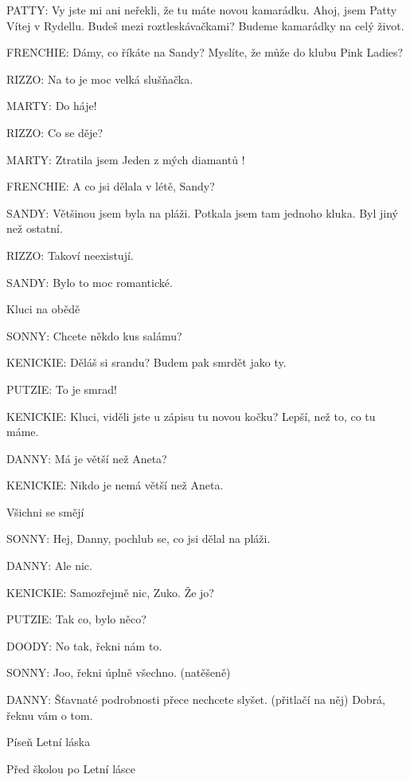 \rep PATTY:        Vy jste mi ani neřekli, že tu máte novou kamarádku.
                Ahoj, jsem Patty  Vítej v Rydellu.
                Budeš mezi roztleskávačkami? Budeme kamarádky na celý život.

\rep FRENCHIE:        Dámy, co říkáte na Sandy? Myslíte, že může do klubu Pink Ladies?

\rep RIZZO:        Na to je moc velká slušňačka.

\rep MARTY:        Do háje!

\rep RIZZO:        Co se děje?

\rep MARTY:         Ztratila jsem Jeden z mých diamantů !

\rep FRENCHIE:         A co jsi dělala v létě, Sandy?

\rep SANDY:        Většinou jsem byla na pláži. Potkala jsem tam jednoho kluka. Byl jiný         než ostatní.

\rep RIZZO:        Takoví neexistují.

\rep SANDY:        Bylo to moc romantické.

\scene Kluci na obědě

\rep SONNY:        Chcete někdo kus salámu?

\rep KENICKIE:         Děláš si srandu? Budem pak smrdět jako ty.

\rep PUTZIE:         To je smrad!

\rep KENICKIE:        Kluci, viděli jste u zápisu tu novou kočku? Lepší, než to, co tu máme.

\rep DANNY:        Má je větší než Aneta?

\rep KENICKIE:        Nikdo je nemá větší než Aneta. 

\pop Všichni se smějí

\rep SONNY:        Hej, Danny,  pochlub se, co jsi dělal na pláži. 

\rep DANNY:        Ale nic. 

\rep KENICKIE:        Samozřejmě nic, Zuko. Že jo?

\rep PUTZIE:         Tak co, bylo něco?

\rep DOODY:        No tak, řekni nám to.

\rep SONNY:         Joo, řekni úplně všechno. (natěšeně)

\rep DANNY:        Šťavnaté podrobnosti přece nechcete slyšet. (přitlačí na něj) Dobrá,                 řeknu vám o tom.

\pop Píseň Letní láska 

\scene Před školou po Letní lásce 


